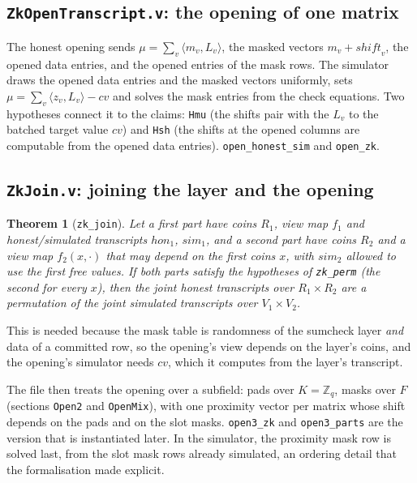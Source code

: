 \documentclass[11pt,a4paper]{article}
\newcommand{\Zq}{\mathbb{Z}_q}
\newcommand{\ip}[2]{\langle #1, #2\rangle}
\theoremstyle{definition}
\theoremstyle{plain}
\newtheorem{theorem}[definition]{Theorem}
\begin{document}
\subsection{\texttt{ZkOpenTranscript.v}: the opening of one matrix}

The honest opening sends $\mu=\sum_v\ip{m_v}{L_v}$, the masked vectors $m_v+\mathit{shift}_v$, the
opened data entries, and the opened entries of the mask rows. The simulator draws the opened data
entries and the masked vectors uniformly, sets $\mu=\sum_v\ip{z_v}{L_v}-cv$ and solves the mask
entries from the check equations. Two hypotheses connect it to the claims: \texttt{Hmu} (the shifts
pair with the $L_v$ to the batched target value $cv$) and \texttt{Hsh} (the shifts at the opened
columns are computable from the opened data entries). \texttt{open\_honest\_sim} and
\texttt{open\_zk}.

\subsection{\texttt{ZkJoin.v}: joining the layer and the opening}

\begin{theorem}[\texttt{zk\_join}]
Let a first part have coins $R_1$, view map $f_1$ and honest/simulated transcripts $\mathit{hon}_1$,
$\mathit{sim}_1$, and a second part have coins $R_2$ and a view map $f_2(x,\cdot)$ that may depend
on the first coins $x$, with $\mathit{sim}_2$ allowed to use the first free values. If both parts
satisfy the hypotheses of \texttt{zk\_perm} (the second for every $x$), then the joint honest
transcripts over $R_1\times R_2$ are a permutation of the joint simulated transcripts over
$V_1\times V_2$.
\end{theorem}
This is needed because the mask table is randomness of the sumcheck layer \emph{and} data of a
committed row, so the opening's view depends on the layer's coins, and the opening's simulator
needs $cv$, which it computes from the layer's transcript.

The file then treats the opening over a subfield: pads over $K=\Zq$, masks over $F$ (sections
\texttt{Open2} and \texttt{OpenMix}), with one proximity vector per matrix whose shift depends on the
pads and on the slot masks. \texttt{open3\_zk} and \texttt{open3\_parts} are the version that is
instantiated later. In the simulator, the proximity mask row is solved last, from the slot mask
rows already simulated, an ordering detail that the formalisation made explicit.
\end{document}
